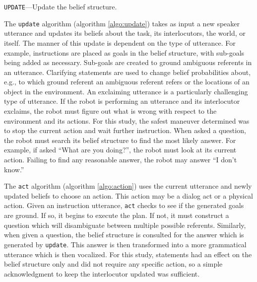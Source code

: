 \documentclass[12pt]{article}
\begin{document}
\begin{algorithm}
  \DontPrintSemicolon
  \caption{\texttt{UPDATE}---Update the belief structure.}
  \label{algo:update}
\end{algorithm}

The \texttt{update} algorithm (algorithm \ref{algo:update}) takes as
input a new speaker utterance and updates its beliefs about the task,
its interlocutors, the world, or itself. The manner of this update is
dependent on the type of utterance. For example, instructions are
placed as goals in the belief structure, with sub-goals being added as
necessary. Sub-goals are created to ground ambiguous referents in an
utterance. Clarifying statements are used to change belief
probabilities about, e.g., to which ground referent an ambiguous
referent refers or the locations of an object in the environment. An
exclaiming utterance is a particularly challenging type of
utterance. If the robot is performing an utterance and its
interlocutor exclaims, the robot must figure out what is wrong with
respect to the environment and its actions. For this study, the safest
maneuver determined was to stop the current action and wait further
instruction. When asked a question, the robot must search its belief
structure to find the most likely answer. For example, if asked ``What
are you doing?'', the robot must look at its current action. Failing
to find any reasonable answer, the robot may answer ``I don't know.''

The \texttt{act} algorithm (algorithm \ref{algo:action}) uses the
current utterance and newly updated beliefs to choose an action. This
action may be a dialog act or a physical action. Given an instruction
utterance, \texttt{act} checks to see if the generated goals are
ground. If so, it begins to execute the plan. If not, it must
construct a question which will disambiguate between multiple possible
referents. Similarly, when given a question, the belief structure is
consulted for the answer which is generated by \texttt{update}. This
answer is then transformed into a more grammatical utterance which is
then vocalized. For this study, statements had an effect on the belief
structure only and did not require any specific action, so a simple
acknowledgment to keep the interlocutor updated was sufficient.
\end{document}
